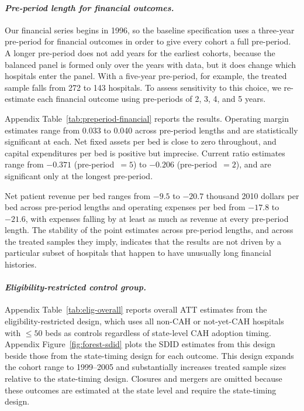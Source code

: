 \documentclass[a4paper, 12pt]{article}
\begin{document}
\paragraph{\textit{Pre-period length for financial outcomes.}}
Our financial series begins in 1996, so the baseline specification uses a three-year pre-period for financial outcomes in order to give every cohort a full pre-period. A longer pre-period does not add years for the earliest cohorts, because the balanced panel is formed only over the years with data, but it does change which hospitals enter the panel. With a five-year pre-period, for example, the treated sample falls from 272 to 143 hospitals. To assess sensitivity to this choice, we re-estimate each financial outcome using pre-periods of 2, 3, 4, and 5 years.

Appendix Table~\ref{tab:preperiod-financial} reports the results. Operating margin estimates range from 0.033 to 0.040 across pre-period lengths and are statistically significant at each. Net fixed assets per bed is close to zero throughout, and capital expenditures per bed is positive but imprecise. Current ratio estimates range from $-0.371$ (pre-period~$=5$) to $-0.206$ (pre-period~$=2$), and are significant only at the longest pre-period.

Net patient revenue per bed ranges from $-9.5$ to $-20.7$ thousand 2010 dollars per bed across pre-period lengths and operating expenses per bed from $-17.8$ to $-21.6$, with expenses falling by at least as much as revenue at every pre-period length. The stability of the point estimates across pre-period lengths, and across the treated samples they imply, indicates that the results are not driven by a particular subset of hospitals that happen to have unusually long financial histories.

\paragraph{\textit{Eligibility-restricted control group.}}
Appendix Table~\ref{tab:elig-overall} reports overall ATT estimates from the eligibility-restricted design, which uses all non-CAH or not-yet-CAH hospitals with $\leq 50$ beds as controls regardless of state-level CAH adoption timing. Appendix Figure~\ref{fig:forest-sdid} plots the SDID estimates from this design beside those from the state-timing design for each outcome. This design expands the cohort range to 1999--2005 and substantially increases treated sample sizes relative to the state-timing design. Closures and mergers are omitted because these outcomes are estimated at the state level and require the state-timing design.
\end{document}
